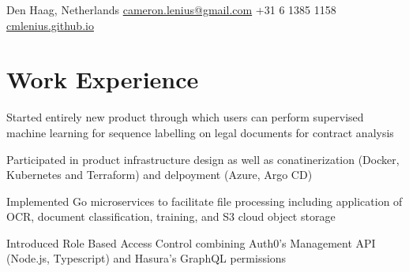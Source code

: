 \documentclass[]{resume}
\begin{document}

\separatorL
\contactline
  {Den Haag, Netherlands}
  {\href{mailto:cameron.lenius@gmail.com}{cameron.lenius@gmail.com}}
  {+31 6 1385 1158}
  {\href{cmlenius.github.io}{cmlenius.github.io}}
\separatorS

\begin{minipage}[t]{0.65\textwidth} 




\section{Work Experience}
\vspace{\topsep} %
\separatorS
\begin{tightemize}
\item Started entirely new product through which users can perform supervised machine learning for sequence labelling on legal documents for contract analysis
\item Participated in product infrastructure design as well as conatinerization (Docker, Kubernetes and Terraform) and delpoyment (Azure, Argo CD)
\item Implemented Go microservices to facilitate file processing including application of OCR, document classification, training, and S3 cloud object storage
\item Introduced Role Based Access Control combining Auth0's Management API (Node.js, Typescript) and Hasura's GraphQL permissions
\end{tightemize}
\separatorM


\end{minipage}
\end{document}

